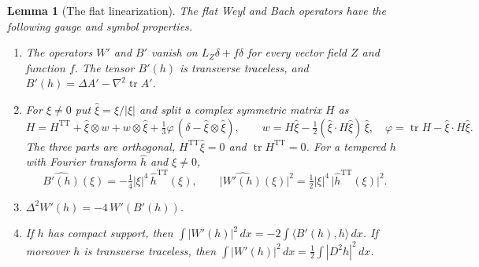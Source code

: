 \documentclass[11pt]{article}
\numberwithin{equation}{section}
\newtheorem{lemma}[theorem]{Lemma}
\theoremstyle{definition}
\theoremstyle{remark}
\DeclareMathOperator{\tr}{tr}
\begin{document}
\begin{lemma}[The flat linearization]\label{msneck:flat-lemma}
The flat Weyl and Bach operators have the following gauge and symbol properties.
\begin{enumerate}[label=\textup{(\roman*)}]
\item The operators \(W'\) and \(B'\) vanish on \(L_Z\delta+f\delta\)
for every vector field \(Z\) and function \(f\). The tensor \(B'(h)\) is
transverse traceless, and \(B'(h)=\Delta A'-\nabla^2\tr A'\).
\item For \(\xi\ne0\) put \(\hat\xi=\xi/|\xi|\) and split a complex
symmetric matrix \(H\) as
\begin{equation}\label{msneck:tt-split}
 H=H^{\mathrm{TT}}+\hat\xi\otimes w+w\otimes\hat\xi
   +\tfrac13\varphi\,(\delta-\hat\xi\otimes\hat\xi),\qquad
 w=H\hat\xi-\tfrac12(\hat\xi\cdot H\hat\xi)\,\hat\xi,\quad
 \varphi=\tr H-\hat\xi\cdot H\hat\xi .
\end{equation}
The three parts are orthogonal, \(H^{\mathrm{TT}}\hat\xi=0\) and
\(\tr H^{\mathrm{TT}}=0\). For a tempered \(h\) with Fourier transform
\(\hat h\) and \(\xi\ne0\),
\begin{equation}\label{msneck:symbols}
 \widehat{B'(h)}(\xi)=-\tfrac14|\xi|^4\,\hat h^{\mathrm{TT}}(\xi),\qquad
 \bigl|\widehat{W'(h)}(\xi)\bigr|^2=\tfrac12|\xi|^4\,
 \bigl|\hat h^{\mathrm{TT}}(\xi)\bigr|^2 .
\end{equation}
\item \(\Delta^2W'(h)=-4\,W'(B'(h))\).
\item If \(h\) has compact support, then
\(\int|W'(h)|^2\,dx=-2\int\langle B'(h),h\rangle\,dx\). If moreover
\(h\) is transverse traceless, then
\(\int|W'(h)|^2\,dx=\tfrac12\int|D^2h|^2\,dx\).
\end{enumerate}
\end{lemma}
\end{document}
